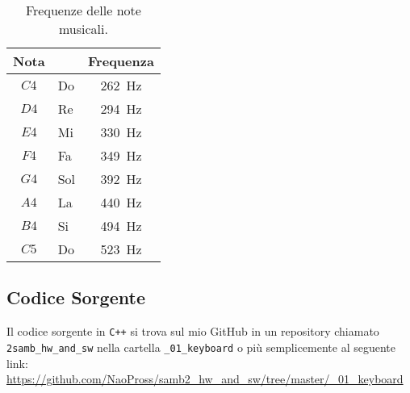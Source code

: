 \documentclass[a4paper]{article}
\begin{document}
			\begin{table}[h]
				\begin{center} \begin{tabular}{ | c l | c | }
					\hline
					Nota  & & Frequenza \\
					\hline
					$C4$ & Do & \SI{262}{\hertz} \\
					$D4$ & Re & \SI{294}{\hertz} \\
					$E4$ & Mi & \SI{330}{\hertz} \\
					$F4$ & Fa & \SI{349}{\hertz} \\
					$G4$ & Sol & \SI{392}{\hertz} \\
					$A4$ & La & \SI{440}{\hertz} \\
					$B4$ & Si & \SI{494}{\hertz} \\
					$C5$ & Do & \SI{523}{\hertz} \\
					\hline
				\end{tabular} \end{center}
				\caption{Frequenze delle note musicali.}
			\end{table}
		
		\subsection{Codice Sorgente}
			Il codice sorgente in \texttt{C++} si trova sul mio GitHub in un repository
			chiamato \texttt{2samb\_hw\_and\_sw} nella cartella \texttt{\_01\_keyboard} o più semplicemente
			al seguente link: \\
			\url{https://github.com/NaoPross/samb2_hw_and_sw/tree/master/_01_keyboard}
			
\end{document}
